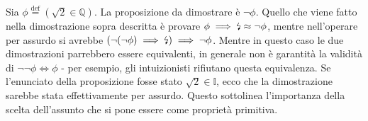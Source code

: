 Sia \(\phi \overset{\text{def}}{=} \left(\sqrt{2} \in \mathbb{Q}\right)\). La proposizione da dimostrare è \(\lnot \phi\). Quello che viene fatto nella dimostrazione sopra descritta è provare \(\phi \implies \text{\lightning} \approx \lnot \phi\), mentre nell'operare per assurdo si avrebbe \(\left(\lnot(\lnot \phi) \implies \text{\lightning}\right) \implies \lnot \phi\). Mentre in questo caso le due dimostrazioni parrebbero essere equivalenti, in generale non è garantità la validità di \(\lnot\lnot\phi \iff \phi\)
- per esempio, gli intuizionisti rifiutano questa equivalenza. Se l'enunciato della proposizione fosse stato \(\sqrt{2} \in \mathbb{I}\), ecco che la dimostrazione sarebbe stata effettivamente per assurdo. Questo sottolinea l'importanza della scelta dell'assunto che si pone essere come proprietà primitiva.
